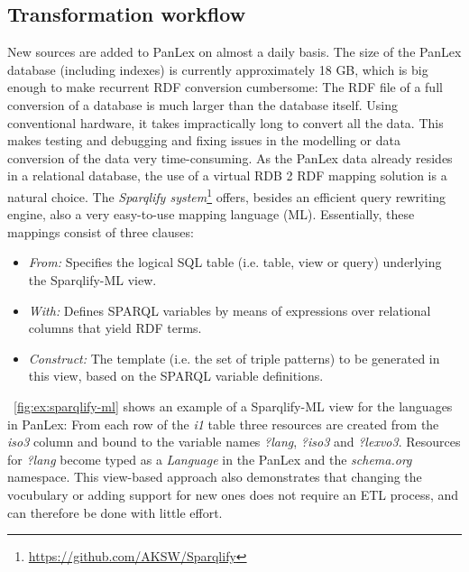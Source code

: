 \documentclass[sw]{iosart2c}
\newcommand*{\origtodo}{}
\let\origtodo\todo
\renewcommand*{\todo}{\origtodo[inline]}
\begin{document}
\subsection{Transformation workflow}
\label{sec:conversion}
New sources are added to PanLex on almost a daily basis.   
The size of the PanLex database (including indexes) is currently approximately
18 GB, which is big enough to make recurrent RDF conversion cumbersome:
The RDF file of a full conversion of a database is much larger than the
database itself.
Using conventional hardware, it takes impractically long
to convert all the data. This makes
testing and debugging and fixing issues in the modelling or data conversion of the
data very time-consuming.
As the PanLex data already resides in a relational database, the use of a virtual
RDB 2 RDF mapping solution is a natural choice.
The \emph{Sparqlify system}\footnote{\url{https://github.com/AKSW/Sparqlify}} offers,
besides an efficient query rewriting engine, also a very easy-to-use mapping
language (ML).
Essentially, these mappings consist of three clauses:
\begin{itemize}
  \item \emph{From:} Specifies the logical SQL table (i.e. table, view or query) underlying the Sparqlify-ML view.
  \item \emph{With:} Defines SPARQL variables by means of expressions over relational columns that yield RDF terms.
  \item \emph{Construct:} The template (i.e. the set of triple patterns) to be generated in this view, based on the SPARQL variable definitions.
\end{itemize}
~\autoref{fig:ex:sparqlify-ml} shows an example of a Sparqlify-ML view for the
languages in PanLex: From each row of the \emph{i1} table three resources are
created from the \emph{iso3} column and 
bound to the variable names \emph{?lang}, \emph{?iso3} and \emph{?lexvo3}.
Resources for \emph{?lang} become typed as a \emph{Language} in the PanLex and the \emph{schema.org} namespace.
This view-based approach also demonstrates that changing the vocubulary or
adding support for new ones does not require an ETL process, and can therefore be done with little effort.
 
\end{document}
